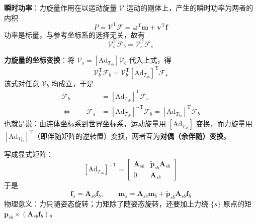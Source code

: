 \textbf{瞬时功率}：力旋量作用在以运动旋量 $\mathcal{V}$ 运动的刚体上，产生的瞬时功率为两者的内积
\begin{equation}
	\label{eq:力旋量:功率}
	P=\mathcal{V}^{\mathrm{T}}\mathcal{F}=\boldsymbol{\omega}^{\mathrm{T}}\boldsymbol{m}+\boldsymbol{v}^{\mathrm{T}}\boldsymbol{f}
\end{equation}
功率是标量，与参考坐标系的选择无关，故有
\begin{equation}
	\label{eq:力旋量:功率不变}
	\mathcal{V}_{b}^{\mathrm{T}}\mathcal{F}_{b}=\mathcal{V}_{s}^{\mathrm{T}}\mathcal{F}_{s}
\end{equation}

\textbf{力旋量的坐标变换}：将 $\mathcal{V}_{s}=[\mathrm{Ad}_{T_{sb}}]\mathcal{V}_{b}$ 代入上式，得
\begin{equation}
	\label{eq:力旋量:代入}
	\mathcal{V}_{b}^{\mathrm{T}}\mathcal{F}_{b}=\mathcal{V}_{b}^{\mathrm{T}}[\mathrm{Ad}_{T_{sb}}]^{\mathrm{T}}\mathcal{F}_{s}
\end{equation}
该式对任意 $\mathcal{V}_{b}$ 均成立，于是
\begin{equation}
	\label{eq:力旋量:变换}
	\begin{aligned}
		\mathcal{F}_{b}&=[\mathrm{Ad}_{T_{sb}}]^{\mathrm{T}}\mathcal{F}_{s}\\
		\Longleftrightarrow\qquad
		\mathcal{F}_{s}&=[\mathrm{Ad}_{T_{sb}}]^{-\mathrm{T}}\mathcal{F}_{b}
		=[\mathrm{Ad}_{T_{bs}}]^{\mathrm{T}}\mathcal{F}_{b}
	\end{aligned}
\end{equation}
也就是说：由连体坐标系到世界坐标系，运动旋量用 $[\mathrm{Ad}_{T_{sb}}]$ 变换，而力旋量用 $[\mathrm{Ad}_{T_{bs}}]^{\mathrm{T}}$（即伴随矩阵的逆转置）变换，两者互为\textbf{对偶（余伴随）变换}。

写成显式矩阵：
\begin{equation}
	\label{eq:力旋量:变换矩阵}
	[\mathrm{Ad}_{T_{sb}}]^{-\mathrm{T}}=\begin{bmatrix}
		\boldsymbol{A}_{sb} & \tilde{\boldsymbol{p}}_{sb}\boldsymbol{A}_{sb}\\
		0 & \boldsymbol{A}_{sb}
	\end{bmatrix}
\end{equation}
于是
\begin{equation}
	\label{eq:力旋量:分量形式}
	\boldsymbol{f}_{s}=\boldsymbol{A}_{sb}\boldsymbol{f}_{b},\qquad
	\boldsymbol{m}_{s}=\boldsymbol{A}_{sb}\boldsymbol{m}_{b}+\tilde{\boldsymbol{p}}_{sb}\boldsymbol{A}_{sb}\boldsymbol{f}_{b}
\end{equation}
物理意义：力只随姿态旋转；力矩除了随姿态旋转，还要加上力绕 $\{s\}$ 原点的矩 $\boldsymbol{p}_{sb}\times(\boldsymbol{A}_{sb}\boldsymbol{f}_{b})$。

